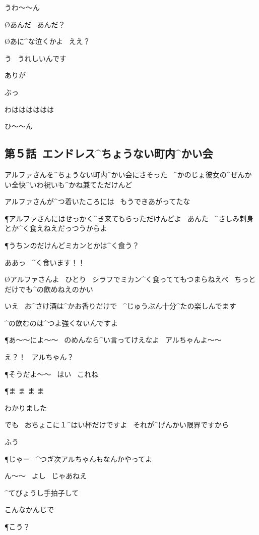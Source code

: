 \page
\A うわ〜〜ん

\O あんだ
\ あんだ？

\O あに^{な}{泣}くかよ
\ ええ？

\A う
\ うれしいんです

\A ありが

\T ぶっ

\page
\T わはははははは

\A ひ〜〜ん


\subsection{第５話\ エンドレス^{ちょうない}{町内}^{かい}{会}}

\page[102]
\N アルファさんを^{ちょうない}{町内}^{かい}{会}にさそった
\ ^{かのじょ}{彼女}の^{ぜんかい}{全快}^{いわ}{祝}いも^{かね}{兼}てただけんど

\page
\N アルファさんが^{つ}{着}いたころには
\ もうできあがってたな

\P アルファさんにはせっかく^{き}{来}てもらっただけんどよ
\ あんた
\ ^{さしみ}{刺身}とか^{く}{食}えねえだっつうからよ

\P うちンのだけんどミカンとかは^{く}{食}う？

\A ああっ
\ ^{く}{食}います！！

\page
\O アルファさんよ
\ ひとり
\ シラフでミカン^{く}{食}っててもつまらねえべ
\ ちっとだけでも^{の}{飲}めねえのかい

\A いえ
\ お^{さけ}{酒}は^{かお}{香}りだけで
\ ^{じゅうぶん}{十分}^{たの}{楽}しんでます

\A ^{の}{飲}むのは^{つよ}{強}くないんですよ

\page
\P あ〜〜によ〜〜
\ のめんなら^{い}{言}ってけえなよ
\ アルちゃんよ〜〜

\A え？！
\ アルちゃん？

\P そうだよ〜〜
\ はい
\ これね

\P ま ま ま ま

\A わかりました

\A でも
\ おちょこに１^{はい}{杯}だけですよ
\ それが^{げんかい}{限界}ですから

\page
\A ふう

\page
\P じゃー
\ ^{つぎ}{次}アルちゃんもなんかやってよ

\A ん〜〜
\ よし
\ じゃあねえ

\A ^{てびょうし}{手拍子}して

\A こんなかんじで

\P こう？

